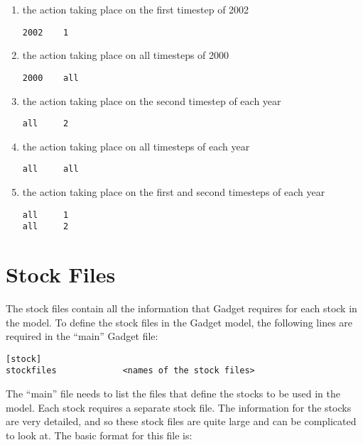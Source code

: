 \documentclass[]{book}
\begin{document}
\begin{enumerate}
\def\labelenumi{\arabic{enumi}.}
\item
  the action taking place on the first timestep of 2002

\begin{verbatim}
2002    1
\end{verbatim}
\item
  the action taking place on all timesteps of 2000

\begin{verbatim}
2000    all
\end{verbatim}
\item
  the action taking place on the second timestep of each year

\begin{verbatim}
all     2
\end{verbatim}
\item
  the action taking place on all timesteps of each year

\begin{verbatim}
all     all
\end{verbatim}
\item
  the action taking place on the first and second timesteps of each
  year

\begin{verbatim}
all     1
all     2
\end{verbatim}
\end{enumerate}

\hypertarget{chap:stock}{%
\chapter{Stock Files}\label{chap:stock}}

The stock files contain all the information that Gadget requires for
each stock in the model. To define the stock files in the Gadget model,
the following lines are required in the ``main'' Gadget file:

\begin{verbatim}
[stock]
stockfiles             <names of the stock files>
\end{verbatim}

The ``main'' file needs to list the files that define the stocks to be
used in the model. Each stock requires a separate stock file. The
information for the stocks are very detailed, and so these stock files
are quite large and can be complicated to look at. The basic format for
this file is:
\end{document}
